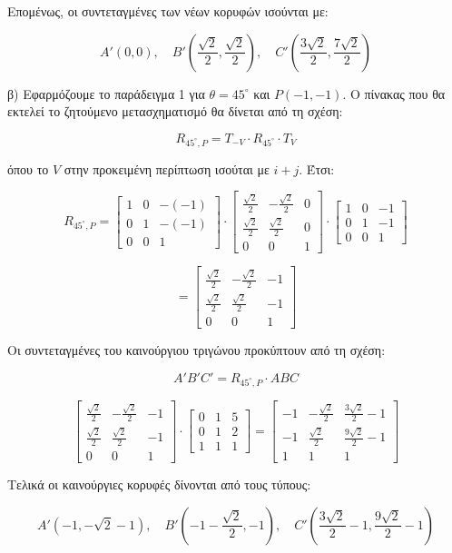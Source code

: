 \begin{solution}
Επομένως, οι συντεταγμένες των νέων κορυφών ισούνται με:

\[
A'(0, 0), \quad B'\left(\frac{\sqrt{2}}{2}, \frac{\sqrt{2}}{2}\right), \quad C'\left(\frac{3\sqrt{2}}{2}, \frac{7\sqrt{2}}{2}\right)
\]

β) Εφαρμόζουμε το παράδειγμα 1 για $\theta = 45^\circ$ και $P(-1, -1)$. Ο πίνακας που θα εκτελεί το ζητούμενο μετασχηματισμό θα δίνεται από τη σχέση:

\[
R_{45^\circ, P} = T_{-V} \cdot R_{45^\circ} \cdot T_V
\]

όπου το $V$ στην προκειμένη περίπτωση ισούται με $i + j$. Έτσι:

\[
R_{45^\circ, P} =
\begin{bmatrix}
1 & 0 & -(-1) \\
0 & 1 & -(-1) \\
0 & 0 & 1
\end{bmatrix}
\cdot
\begin{bmatrix}
\frac{\sqrt{2}}{2} & -\frac{\sqrt{2}}{2} & 0 \\
\frac{\sqrt{2}}{2} & \frac{\sqrt{2}}{2} & 0 \\
0 & 0 & 1
\end{bmatrix}
\cdot
\begin{bmatrix}
1 & 0 & -1 \\
0 & 1 & -1 \\
0 & 0 & 1
\end{bmatrix}
\]

\[
=
\begin{bmatrix}
\frac{\sqrt{2}}{2} & -\frac{\sqrt{2}}{2} & -1 \\
\frac{\sqrt{2}}{2} & \frac{\sqrt{2}}{2} & -1 \\
0 & 0 & 1
\end{bmatrix}
\]

Οι συντεταγμένες του καινούργιου τριγώνου προκύπτουν από τη σχέση:

\[
A'B'C' = R_{45^\circ, P} \cdot ABC
\]

\[
\begin{bmatrix}
\frac{\sqrt{2}}{2} & -\frac{\sqrt{2}}{2} & -1 \\
\frac{\sqrt{2}}{2} & \frac{\sqrt{2}}{2} & -1 \\
0 & 0 & 1
\end{bmatrix}
\cdot
\begin{bmatrix}
0 & 1 & 5 \\
0 & 1 & 2 \\
1 & 1 & 1
\end{bmatrix}
=
\begin{bmatrix}
-1 & -\frac{\sqrt{2}}{2} & \frac{3\sqrt{2}}{2} - 1 \\
-1 & \frac{\sqrt{2}}{2} & \frac{9\sqrt{2}}{2} - 1 \\
1 & 1 & 1
\end{bmatrix}
\]

Τελικά οι καινούργιες κορυφές δίνονται από τους τύπους:

\[
A'(-1, -\sqrt{2}-1), \quad B'(-1-\frac{\sqrt{2}}{2}, -1), \quad C'(\frac{3\sqrt{2}}{2}-1, \frac{9\sqrt{2}}{2}-1)
\]

\end{solution}
